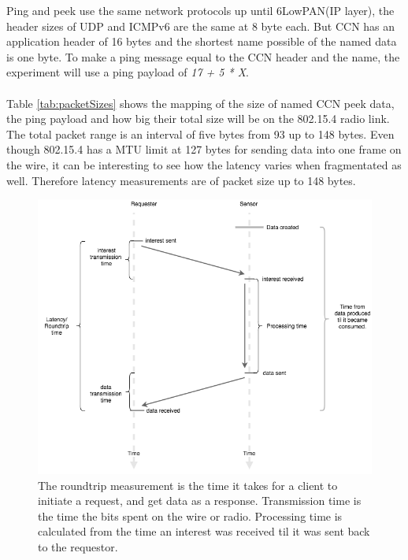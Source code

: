Ping and peek use the same network protocols up until 6LowPAN(IP layer), the header sizes of UDP and ICMPv6 are the same at 8 byte each. But CCN has an application header of 16 bytes and the shortest name possible of the named data is one byte. To make a ping message equal to the CCN header and the name, the experiment will use a ping payload of \textit{17 + 5 * X}. 
\\\\Table \ref{tab:packetSizes} shows the mapping of the size of named CCN peek data, the ping payload and how big their total size will be on the 802.15.4 radio link. The total packet range is an interval of five bytes from 93 up to 148 bytes. 
Even though 802.15.4 has a MTU limit at 127 bytes for sending data into one frame on the wire, it can be interesting to see how the latency varies when fragmentated as well. Therefore latency measurements are of packet size up to 148 bytes.

\begin{figure}
    \includegraphics[width=\textwidth]{figures/latency.png}
    \caption{The roundtrip measurement is the time it takes for a client to initiate a request, and get data as a response. Transmission time is the time the bits spent on the wire or radio. Processing time is calculated from the time an interest was received til it was sent back to the requestor.}
    \label{fig:latency}
\end{figure}



